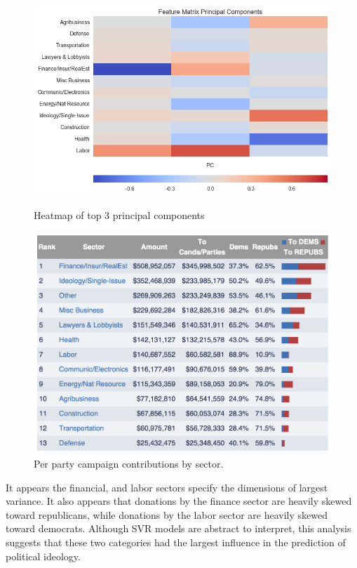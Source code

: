 \documentclass[12]{article}
\begin{document}
\begin{figure}[H]
\centering
\begin{minipage}[b]{0.4\textwidth}
    \includegraphics[width=\textwidth]{cand_2010_2012_2014_fm_trim_normed_pc_hm.png}
    \caption{\label{fig:pc_all}Heatmap of top 3 principal components}
\end{minipage}
\begin{minipage}[b]{0.4\textwidth}
    \includegraphics[width=\textwidth]{totals_by_sector.png}
    \caption{\label{fig:pc_all}Per party campaign contributions by sector.}
\end{minipage}
\end{figure}

It appears the financial, and labor sectors specify the dimensions of largest
variance. It also appears that donations by the finance sector are heavily skewed 
toward republicans, while donations by the labor sector are heavily skewed toward
democrats. Although SVR models are abstract to interpret, this analysis suggests
that these two categories had the largest influence in the prediction of political 
ideology.
\end{document}
